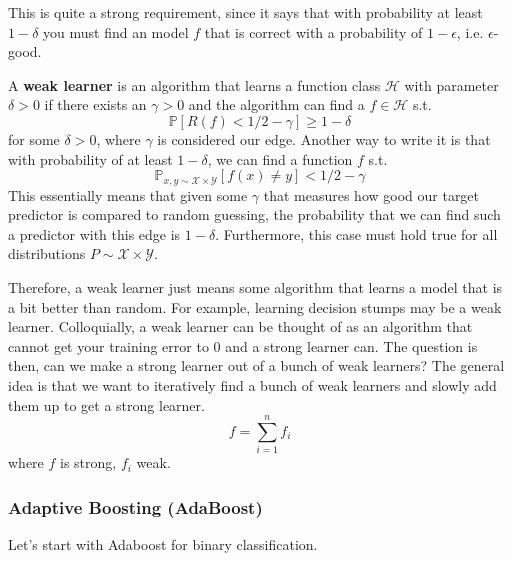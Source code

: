 \documentclass{article}
\begin{document}
        This is quite a strong requirement, since it says that with probability at least $1 - \delta$ you must find an model $f$ that is correct with a probability of $1 - \epsilon$, i.e. $\epsilon$-good.

        \begin{definition}
          A \textbf{weak learner} is an algorithm that learns a function class $\mathcal{H}$ with parameter $\delta > 0$ if there exists an $\gamma > 0$ and the algorithm can find a $f \in \mathcal{H}$ s.t. 
          \begin{equation}
            \mathbb{P}[ R(f) < 1/2 - \gamma] \geq 1 - \delta
          \end{equation}
          for some $\delta > 0$, where $\gamma$ is considered our edge. Another way to write it is that with probability of at least $1 - \delta$, we can find a function $f$ s.t. 
          \begin{equation}
            \mathbb{P}_{x, y \sim \mathcal{X} \times \mathcal{Y}} [f(x) \neq y] < 1/2 - \gamma 
          \end{equation}
          This essentially means that given some $\gamma$ that measures how good our target predictor is compared to random guessing, the probability that we can find such a predictor with this edge is $1 - \delta$. Furthermore, this case must hold true for all distributions $P \sim \mathcal{X} \times \mathcal{Y}$. 
        \end{definition}

        Therefore, a weak learner just means some algorithm that learns a model that is a bit better than random. For example, learning decision stumps may be a weak learner. Colloquially, a weak learner can be thought of as an algorithm that cannot get your training error to $0$ and a strong learner can. The question is then, can we make a strong learner out of a bunch of weak learners? The general idea is that we want to iteratively find a bunch of weak learners and slowly add them up to get a strong learner. 
        \begin{equation}
          f = \sum_{i=1}^n f_i
        \end{equation}
        where $f$ is strong, $f_i$ weak. 

      \subsubsection{Adaptive Boosting (AdaBoost)} 

        Let's start with Adaboost for binary classification. 
\end{document}
